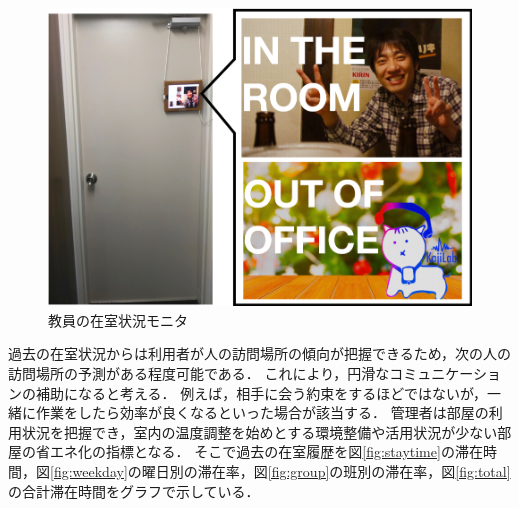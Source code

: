 \begin{figure}[H]
  \begin{center}
    \includegraphics[width=150mm]{image/OccupancyMonitor.png}
    \caption{教員の在室状況モニタ}
    \label{fig:monitor}
  \end{center}
\end{figure}

過去の在室状況からは利用者が人の訪問場所の傾向が把握できるため，次の人の訪問場所の予測がある程度可能である．
これにより，円滑なコミュニケーションの補助になると考える．
例えば，相手に会う約束をするほどではないが，一緒に作業をしたら効率が良くなるといった場合が該当する．
管理者は部屋の利用状況を把握でき，室内の温度調整を始めとする環境整備や活用状況が少ない部屋の省エネ化の指標となる．
そこで過去の在室履歴を図\ref{fig:staytime}の滞在時間，図\ref{fig:weekday}の曜日別の滞在率，図\ref{fig:group}の班別の滞在率，図\ref{fig:total}の合計滞在時間をグラフで示している．




